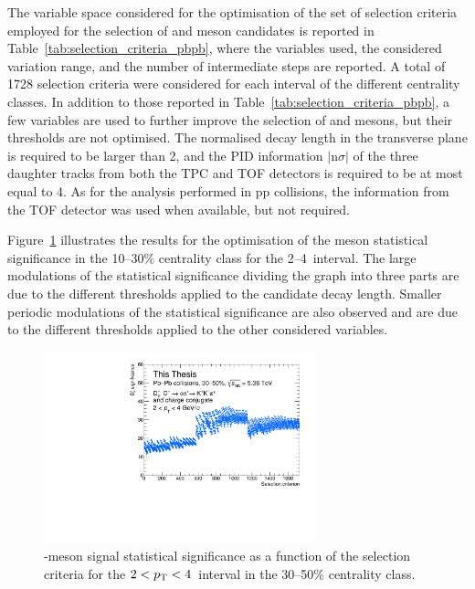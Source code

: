 The variable space considered for the optimisation of the set of selection criteria employed for the selection of \ds and \dpl meson candidates is reported in Table~\ref{tab:selection_criteria_pbpb}, where the variables used, the considered variation range, and the number of intermediate steps are reported. A total of 1728 selection criteria were considered for each \pt interval of the different centrality classes. In addition to those reported in Table~\ref{tab:selection_criteria_pbpb}, a few variables are used to further improve the selection of \ds and \dpl mesons, but their thresholds are not optimised. The normalised decay length in the transverse plane is required to be larger than 2, and the PID information $\lvert\mathrm{n}\sigma\rvert$ of the three daughter tracks from both the TPC and TOF detectors is required to be at most equal to 4. As for the analysis performed in pp collisions, the information from the TOF detector was used when available, but not required. 

Figure~\ref{fig:signif_scan_pbpb} illustrates the results for the optimisation of the \ds meson statistical significance in the 10--30\% centrality class for the 2--4~\gevc \pt interval. The large modulations of the statistical significance dividing the graph into three parts are due to the different thresholds applied to the candidate decay length. Smaller periodic modulations of the \ds statistical significance are also observed and are due to the different thresholds applied to the other considered variables.

\begin{figure}[htb]
    \centering
    \includegraphics[width=0.7\textwidth]{Figures/Chapter 8/SignificanceScan.pdf}
    \caption{\ds-meson signal statistical significance as a function of the selection criteria for the $2<p_\mathrm{T}<4$~\gevc interval in the 30--50\% centrality class.}
    \label{fig:signif_scan_pbpb}
\end{figure}

